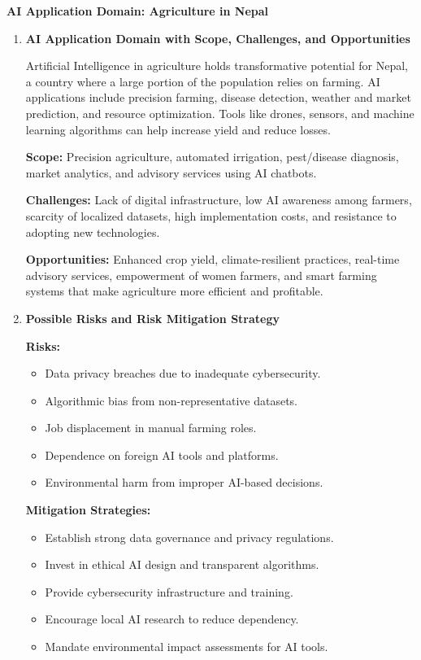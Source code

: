\begin{answer}
\textbf{AI Application Domain: Agriculture in Nepal}

\begin{enumerate}
  \item \textbf{AI Application Domain with Scope, Challenges, and Opportunities}

Artificial Intelligence in agriculture holds transformative potential for Nepal, a country where a large portion of the population relies on farming. AI applications include precision farming, disease detection, weather and market prediction, and resource optimization. Tools like drones, sensors, and machine learning algorithms can help increase yield and reduce losses.

\textbf{Scope:} Precision agriculture, automated irrigation, pest/disease diagnosis, market analytics, and advisory services using AI chatbots.

\textbf{Challenges:} Lack of digital infrastructure, low AI awareness among farmers, scarcity of localized datasets, high implementation costs, and resistance to adopting new technologies.

\textbf{Opportunities:} Enhanced crop yield, climate-resilient practices, real-time advisory services, empowerment of women farmers, and smart farming systems that make agriculture more efficient and profitable.

  \item \textbf{Possible Risks and Risk Mitigation Strategy}

\textbf{Risks:} 
\begin{itemize}
  \item Data privacy breaches due to inadequate cybersecurity.
  \item Algorithmic bias from non-representative datasets.
  \item Job displacement in manual farming roles.
  \item Dependence on foreign AI tools and platforms.
  \item Environmental harm from improper AI-based decisions.
\end{itemize}

\textbf{Mitigation Strategies:}
\begin{itemize}
  \item Establish strong data governance and privacy regulations.
  \item Invest in ethical AI design and transparent algorithms.
  \item Provide cybersecurity infrastructure and training.
  \item Encourage local AI research to reduce dependency.
  \item Mandate environmental impact assessments for AI tools.
\end{itemize}


\end{enumerate}
\end{answer}
